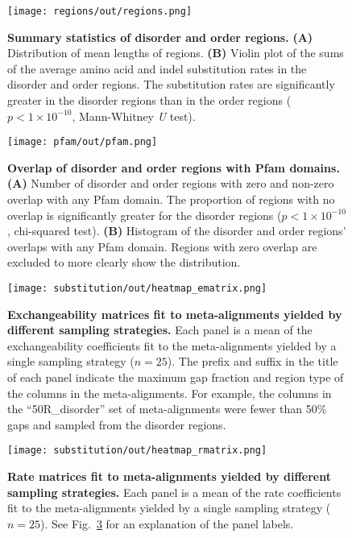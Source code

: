 \begin{figure}[h!]
\texttt{[image: regions/out/regions.png]}
\centering
\caption{\textbf{Summary statistics of disorder and order regions.}
\textbf{(A)} Distribution of mean lengths of regions.
\textbf{(B)} Violin plot of the sums of the average amino acid and indel substitution rates in the disorder and order regions. The substitution rates are significantly greater in the disorder regions than in the order regions ($p < 1 \times 10^{-10}$, Mann-Whitney \textit{U} test).}
\label{sfig:regions}
\end{figure}

\begin{figure}[h!]
\texttt{[image: pfam/out/pfam.png]}
\centering
\caption{\textbf{Overlap of disorder and order regions with Pfam domains.}
\textbf{(A)} Number of disorder and order regions with zero and non-zero overlap with any Pfam domain. The proportion of regions with no overlap is significantly greater for the disorder regions ($p < 1 \times 10^{-10}$, chi-squared test).
\textbf{(B)} Histogram of the disorder and order regions' overlaps with any Pfam domain. Regions with zero overlap are excluded to more clearly show the distribution.}
\label{sfig:pfam}
\end{figure}

\begin{figure}[h!]
\texttt{[image: substitution/out/heatmap\_ematrix.png]}
\centering
\caption{\textbf{Exchangeability matrices fit to meta-alignments yielded by different sampling strategies.}
Each panel is a mean of the exchangeability coefficients fit to the meta-alignments yielded by a single sampling strategy ($n = 25$). The prefix and suffix in the title of each panel indicate the maximum gap fraction and region type of the columns in the meta-alignments. For example, the columns in the ``50R\_disorder'' set of meta-alignments were fewer than 50\% gaps and sampled from the disorder regions.}
\label{sfig:heatmap_ematrix}
\end{figure}

\begin{figure}[h!]
\texttt{[image: substitution/out/heatmap\_rmatrix.png]}
\centering
\caption{\textbf{Rate matrices fit to meta-alignments yielded by different sampling strategies.}
Each panel is a mean of the rate coefficients fit to the meta-alignments yielded by a single sampling strategy ($n = 25$). See Fig.~\ref{sfig:heatmap_ematrix} for an explanation of the panel labels.}
\label{sfig:heatmap_rmatrix}
\end{figure}

